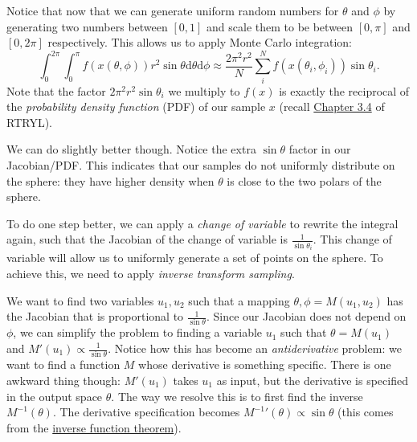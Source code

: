 Notice that now that we can generate uniform random numbers for $\theta$ and $\phi$ by generating two numbers between $[0, 1]$ and scale them to be between $[0, \pi]$ and $[0, 2\pi]$ respectively. This allows us to apply Monte Carlo integration:
\begin{equation}
	\int_{0}^{2\pi}\int_{0}^{\pi} f(x(\theta, \phi)) r^2 \sin\theta \mathrm{d}\theta \mathrm{d} \phi
	\approx \frac{2\pi^2 r^2}{N} \sum_i^N f(x(\theta_i, \phi_i))\sin\theta_i.
	\label{eq:naive_monte_carlo_sphere}
\end{equation}
Note that the factor $2\pi^2 r^2 \sin\theta_i$ we multiply to $f(x)$ is exactly the reciprocal of the \emph{probability density function} (PDF) of our sample $x$ (recall \href{https://raytracing.github.io/books/RayTracingTheRestOfYourLife.html#onedimensionalmcintegration/importancesampling}{Chapter 3.4} of RTRYL). 

We can do slightly better though. Notice the extra $\sin\theta$ factor in our Jacobian/PDF. This indicates that our samples do not uniformly distribute on the sphere: they have higher density when $\theta$ is close to the two polars of the sphere.

To do one step better, we can apply a \emph{change of variable} to rewrite the integral again, such that the Jacobian of the change of variable is $\frac{1}{\sin\theta_i}$. This change of variable will allow us to uniformly generate a set of points on the sphere. To achieve this, we need to apply \emph{inverse transform sampling}. 

We want to find two variables $u_1, u_2$ such that a mapping $\theta, \phi = M(u_1, u_2)$ has the Jacobian that is proportional to $\frac{1}{\sin\theta}$. Since our Jacobian does not depend on $\phi$, we can simplify the problem to finding a variable $u_1$ such that $\theta = M(u_1)$ and $M'(u_1) \propto \frac{1}{\sin\theta}$. Notice how this has become an \emph{antiderivative} problem: we want to find a function $M$ whose derivative is something specific. There is one awkward thing though: $M'(u_1)$ takes $u_1$ as input, but the derivative is specified in the output space $\theta$. The way we resolve this is to first find the inverse $M^{-1}(\theta)$. The derivative specification becomes ${M^{-1}}'(\theta) \propto \sin\theta$ (this comes from the \href{https://en.wikipedia.org/wiki/Inverse_function_theorem}{inverse function theorem}). 

